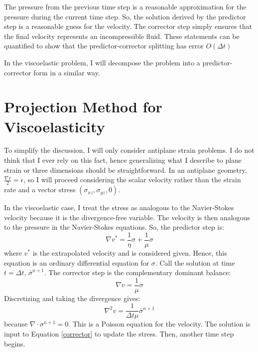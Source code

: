 \documentclass[a4paper]{article}
\begin{document}
The pressure from the previous time step is a reasonable approximation for the pressure during the current time step.
So, the solution derived by the predictor step is a reasonable guess for the velocity. The corrector step simply ensures that
the final velocity represents an incompressible fluid. These statements can be quantified to show that the
predictor-corrector splitting has error $O(\Delta t)$ \citep{Rannacher1992}

In the viscoelastic problem, I will decompose the problem into a predictor-corrector form in a similar way. 
\section{Projection Method for Viscoelasticity}
To simplify the discussion, I will only consider antiplane strain problems. I do not think that I ever rely on this fact, hence generalizing what I describe 
to plane strain or three dimensions should be straightforward. 
In an antiplane geometry, $\frac{\nabla v}{2} = \dot \epsilon$, so I will proceed considering the scalar velocity rather than the
strain rate and a vector stress $(\sigma_{xz}, \sigma_{yz}, 0)$.

In the viscoelastic case, I treat the stress as analogous to the Navier-Stokes velocity because it is the divergence-free variable. 
The velocity is then analogous to the pressure in the Navier-Stokes equations. So, the predictor step is:
\begin{equation}
    \nabla v^{*} = \frac{1}{\eta}\sigma + \frac{1}{\mu}\dot\sigma
\end{equation}
where $v^{*}$ is the extrapolated velocity and is considered given. Hence, this equation is an ordinary differential equation for $\sigma$.
Call the solution at time $t = \Delta t$, $\bar\sigma^{n+1}$.
The corrector step is the complementary dominant balance:
\begin{equation}
    \nabla v = \frac{1}{\mu}\dot\sigma
    \label{corrector}
\end{equation}
Discretizing and taking the divergence gives:
\begin{equation}
    \nabla^2 v = \frac{1}{\Delta t \mu}\bar\sigma^{n+1}
\end{equation}
because $\nabla \cdot \sigma^{n+1} = 0$.
This is a Poisson equation for the velocity. The solution is input to Equation \ref{corrector} to update the stress. Then, another time step begins.
\end{document}
